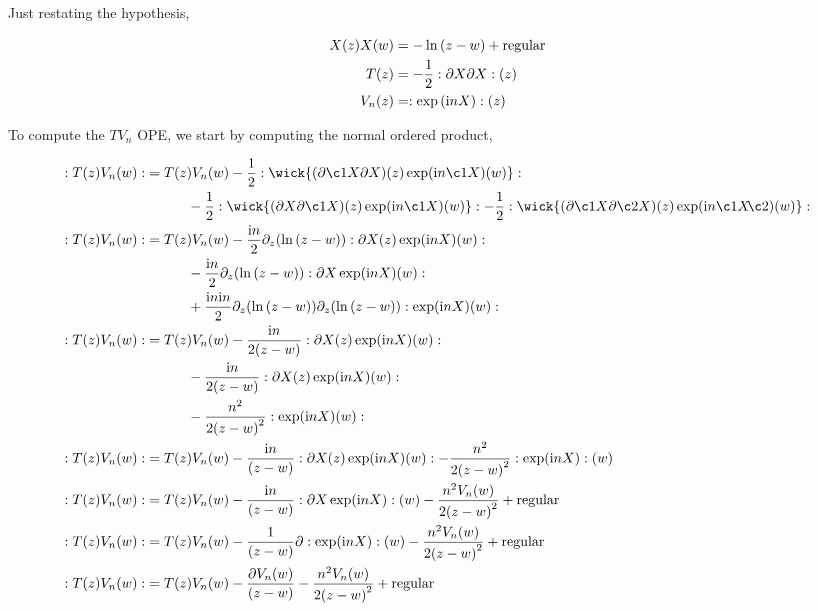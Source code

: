 \problem{}\label{4}
\probitem{}

Just restating the hypothesis,

\begin{align*}
    X\qty(z)X\qty(w)&=-\ln\qty(z-w)+\textnormal{regular}\\
    T\qty(z)&=-\frac12:\partial X\partial X:\qty(z)\\
    V_n\qty(z)&=:\exp\qty(\textnormal{i} n X):\qty(z)
\end{align*}

To compute the $TV_n$ OPE, we start by computing the normal ordered product,

\begin{align*}
    \cnord{T\qty(z)V_n\qty(w)}&=T\qty(z)V_n\qty(w)-\frac12\cnord{\wick{(\partial \c1X\partial X)\qty(z)\exp(\im n \c1X)\qty(w)}}\\
    &\quad\quad\quad-\frac12\cnord{\wick{(\partial X\partial \c1X)\qty(z)\exp(\im n \c1X)\qty(w)}}-\frac12\cnord{\wick{(\partial \c1X\partial\c2 X)\qty(z)\exp(\im n \c1 X\mkern-4mu \c2 {\mathclap{\phantom{X}}})\qty(w)}}\\
    \cnord{T\qty(z)V_n\qty(w)}&=T\qty(z)V_n\qty(w)-\frac{\im n}{2}\partial_z\qty(\ln\qty(z-w))\cnord{\partial X\qty(z)\exp(\im n X)\qty(w)}\\
    &\quad\quad\quad-\frac{\im n}{2}\partial_z\qty(\ln\qty(z-w))\cnord{\partial X\exp(\im n X)\qty(w)}\\
    &\quad\quad\quad+\frac{\im n \im n}{2}\partial_z\qty(\ln\qty(z-w))\partial_z\qty(\ln\qty(z-w))\cnord{\exp(\im n X)\qty(w)}\\
    \cnord{T\qty(z)V_n\qty(w)}&=T\qty(z)V_n\qty(w)-\frac{\im n}{2\qty(z-w)}\cnord{\partial X\qty(z)\exp(\im n X)\qty(w)}\\
    &\quad\quad\quad-\frac{\im n}{2\qty(z-w)}\cnord{\partial X\qty(z)\exp(\im n X)\qty(w)}\\
    &\quad\quad\quad-\frac{n^2}{2\qty(z-w)^2}\cnord{\exp(\im n X)\qty(w)}\\
    \cnord{T\qty(z)V_n\qty(w)}&=T\qty(z)V_n\qty(w)-\frac{\im n}{\qty(z-w)}\cnord{\partial X\qty(z)\exp(\im n X)\qty(w)}-\frac{n^2}{2\qty(z-w)^2}\cnord{\exp(\im n X)}\qty(w)\\
    \cnord{T\qty(z)V_n\qty(w)}&=T\qty(z)V_n\qty(w)-\frac{\im n}{\qty(z-w)}\cnord{\partial X\exp(\im n X)}\qty(w)-\frac{n^2V_n\qty(w)}{2\qty(z-w)^2}+\textnormal{regular}\\
    \cnord{T\qty(z)V_n\qty(w)}&=T\qty(z)V_n\qty(w)-\frac{1}{\qty(z-w)}\partial\cnord{\exp(\im n X)}\qty(w)-\frac{n^2V_n\qty(w)}{2\qty(z-w)^2}+\textnormal{regular}\\
    \cnord{T\qty(z)V_n\qty(w)}&=T\qty(z)V_n\qty(w)-\frac{\partial V_n\qty(w)}{\qty(z-w)}-\frac{n^2V_n\qty(w)}{2\qty(z-w)^2}+\textnormal{regular}
\end{align*}


